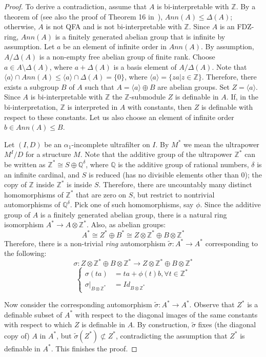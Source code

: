 \documentclass{article}
\theoremstyle{remark}
\def\Z{{\mathbb{Z}}}
\def\Q{{\mathbb{Q}}}
\begin{document}
\begin{proof} To derive a contradiction, assume that $A$ is bi-interpretable with $\Z$. By a theorem of \cite{Oger2006} (see also the proof of Theorem 16 in~\cite{Rich}), $Ann(A)\leq \Delta (A)$; otherwise, $A$ is not QFA and is not bi-interpretable with $\Z$. Since $A$ is an FDZ-ring, $Ann(A)$ is a finitely generated abelian group that is infinite by assumption. Let $a$ be an element of infinite order in $Ann(A)$. By assumption, $A/\Delta(A)$ is a non-empty free abelian group of finite rank. Choose $a\in A\setminus \Delta(A)$, where $a+\Delta (A)$ is a basis element of $A/\Delta(A)$. Note that $\langle a\rangle\cap Ann(A)\leq \langle a\rangle\cap \Delta(A)=\{0\}$, where $\langle a\rangle=\{za| z\in \Z\}$. Therefore, there exists a subgroup $B$ of $A$ such that $A=\langle a\rangle \oplus B$ are abelian groups. Set $Z=\langle a\rangle$. Since $A$ is bi-interpretable with $\Z$ the $\Z$-submodule $Z$ is definable in $A$. If, in the bi-interpretation, $\Z$ is interpreted in $A$ with constants, then $Z$ is definable with respect to these constants. Let us also choose an element of infinite order $b\in Ann(A) \leq B$. 

Let $(I,D)$ be an $\alpha_1$-incomplete ultrafilter on $I$. By $M^*$ we mean the ultrapower $M^I/D$ for a structure $M$. Note that the additive group of the ultrapower $\Z^*$ can be written as $\Z^*\cong S \oplus \Q^\delta$, where $\Q$ is the additive group of rational numbers,  $\delta$ is an infinite cardinal, and $S$ is reduced (has no divisible elements other than $0$); the copy of $\Z$ inside $\Z^*$ is inside $S$. Therefore, there are uncountably many distinct homomorphisms of $\Z^*$ that are zero on $S$, but restrict to nontrivial automorphisms of $\Q^\delta$. Pick one of such homomorphisms, say $\phi$. Since the additive group of $A$ is a finitely generated abelian group, there is a natural ring isomorphism $A^* \to A \otimes \Z^*$. Also, as abelian groups:
$$A^*\cong Z^* \oplus B^*\cong Z\otimes \Z^* \oplus B\otimes \Z^*$$
Therefore, there is a non-trivial \emph{ring} automorphism $\tilde{\sigma}:A^*\to A^*$ corresponding to the following:
$$\sigma:  Z\otimes \Z^* \oplus B\otimes \Z^* \to Z\otimes \Z^* \oplus B\otimes\Z^*$$
$$\left\{\begin{array}{ll} \sigma(ta) &= ta + \phi(t)b, \forall t\in \Z^* \\
\sigma|_{ B\otimes \Z^*}&=Id_{ B\otimes \Z^*}\end{array}\right.$$ 

Now consider the corresponding automorphism $\tilde{\sigma}: A^*\to A^*$. Observe that $Z^*$ is a definable subset of $A^*$ with respect to the diagonal images of the same constants with respect to which $Z$ is definable in $A$. By construction, $\tilde{\sigma}$ fixes (the diagonal copy of) $A$ in $A^*$, but $\tilde{\sigma}(Z^*)\not\subset Z^*$, contradicting the assumption that $Z^*$ is definable in $A^*$. This finishes the proof. \end{proof}
\end{document}

